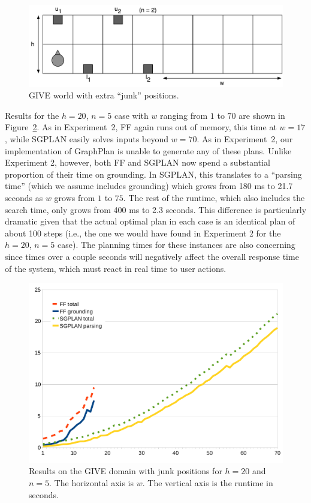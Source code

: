 \documentclass[letterpaper]{article}
\begin{document}
\begin{figure}[t]
  \centering
  \includegraphics[width=0.80\columnwidth]{pic-empty-buttons}
  \caption{GIVE world with extra ``junk'' positions.}
  \label{fig:give-junk}
\end{figure}

Results for the $h=20$, $n=5$ case with $w$ ranging from $1$ to $70$ are
shown in Figure~\ref{fig:give-runtime-junk}. As in Experiment~2, FF again
runs out of memory, this time at $w=17$, while SGPLAN easily solves inputs
beyond $w=70$. As in Experiment~2, our implementation of GraphPlan is
unable to generate any of these plans. Unlike Experiment 2, however, both
FF and SGPLAN now spend a substantial proportion of their time on
grounding. In SGPLAN, this translates to a ``parsing time'' (which we
assume includes grounding) which grows from 180 ms to 21.7 seconds as $w$
grows from $1$ to $75$. The rest of the runtime, which also includes the
search time, only grows from 400 ms to 2.3 seconds. This difference is
particularly dramatic given that the actual optimal plan in each case is an
identical plan of about 100 steps (i.e., the one we would have found in
Experiment 2 for the $h=20$, $n=5$ case). The planning times for these
instances are also concerning since times over a couple seconds will
negatively affect the overall response time of the system, which must react
in real time to user actions.

\begin{figure}[t]
  \centering
  \includegraphics[width=0.75\columnwidth]{graph-exp3}
  \caption{Results on the GIVE domain with junk
    positions for $h=20$ and $n=5$. The horizontal axis is $w$.
    The vertical axis is the runtime in seconds.}
  \label{fig:give-runtime-junk}
\end{figure}
\end{document}
